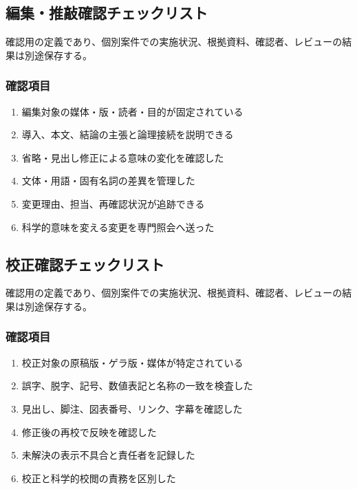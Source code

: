 \documentclass[a4paper,11pt]{article}
\begin{document}
\subsection{編集・推敲確認チェックリスト}
\par 確認用の定義であり、個別案件での実施状況、根拠資料、確認者、レビューの結果は別途保存する。\par\medskip
\subsubsection*{確認項目}
\begin{enumerate}[leftmargin=2em,itemsep=0.3em]
\item 編集対象の媒体・版・読者・目的が固定されている\par
\item 導入、本文、結論の主張と論理接続を説明できる\par
\item 省略・見出し修正による意味の変化を確認した\par
\item 文体・用語・固有名詞の差異を管理した\par
\item 変更理由、担当、再確認状況が追跡できる\par
\item 科学的意味を変える変更を専門照会へ送った\par
\end{enumerate}
\subsection{校正確認チェックリスト}
\par 確認用の定義であり、個別案件での実施状況、根拠資料、確認者、レビューの結果は別途保存する。\par\medskip
\subsubsection*{確認項目}
\begin{enumerate}[leftmargin=2em,itemsep=0.3em]
\item 校正対象の原稿版・ゲラ版・媒体が特定されている\par
\item 誤字、脱字、記号、数値表記と名称の一致を検査した\par
\item 見出し、脚注、図表番号、リンク、字幕を確認した\par
\item 修正後の再校で反映を確認した\par
\item 未解決の表示不具合と責任者を記録した\par
\item 校正と科学的校閲の責務を区別した\par
\end{enumerate}
\end{document}
